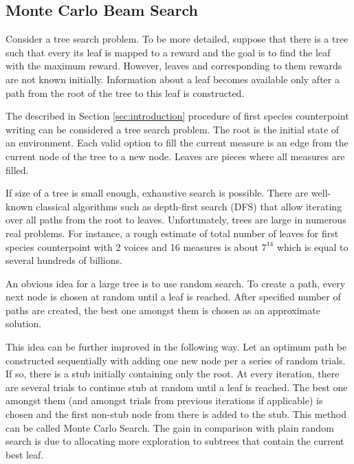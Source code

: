 \documentclass{article}
\begin{document}
\subsection{Monte Carlo Beam Search}
\label{subsec:montecarlo}

Consider a tree search problem. To be more detailed, suppose that there is a tree such that every its leaf is mapped to a reward and the goal is to find the leaf with the maximum reward. However, leaves and corresponding to them rewards are not known initially. Information about a leaf becomes available only after a path from the root of the tree to this leaf is constructed. %

The described in Section \ref{sec:introduction} procedure of first species counterpoint writing can be considered a tree search problem. The root is the initial state of an environment. Each valid option to fill the current measure is an edge from the current node of the tree to a new node. Leaves are pieces where all measures are filled. 

If size of a tree is small enough, exhaustive search is possible. There are well-known classical algorithms such as depth-first search (DFS) that allow iterating over all paths from the root to leaves. Unfortunately, trees are large in numerous real problems. For instance, a rough estimate of total number of leaves for first species counterpoint with 2 voices and 16 measures is about $7^{14}$ which is equal to several hundreds of billions.

An obvious idea for a large tree is to use random search. To create a path, every next node is chosen at random until a leaf is reached. After specified number of paths are created, the best one amongst them is chosen as an approximate solution.

This idea can be further improved in the following way. Let an optimum path be constructed sequentially with adding one new node per a series of random trials. If so, there is a stub initially containing only the root. At every iteration, there are several trials to continue stub at random until a leaf is reached. The best one amongst them (and amongst trials from previous iterations if applicable) is chosen and the first non-stub node from there is added to the stub. This method can be called Monte Carlo Search. The gain in comparison with plain random search is due to allocating more exploration to subtrees that contain the current best leaf.
\end{document}
